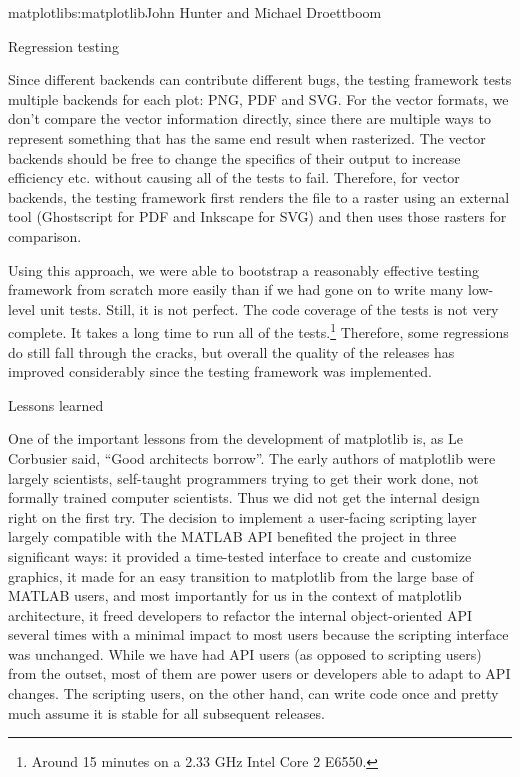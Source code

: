 \begin{aosachapter}{matplotlib}{s:matplotlib}{John Hunter and Michael Droettboom}
\begin{aosasect1}{Regression testing}

Since different backends can contribute different bugs, the testing
framework tests multiple backends for each plot: PNG, PDF and SVG.
For the vector formats, we don't compare the vector information
directly, since there are multiple ways to represent something that
has the same end result when rasterized.  The vector backends should
be free to change the specifics of their output to increase efficiency
etc. without causing all of the tests to fail.  Therefore, for vector
backends, the testing framework first renders the file to a raster
using an external tool (Ghostscript for PDF and Inkscape for SVG) and
then uses those rasters for comparison.

Using this approach, we were able to bootstrap a reasonably effective
testing framework from scratch more easily than if we had gone on to
write many low-level unit tests.  Still, it is not perfect.  The code
coverage of the tests is not very complete.  It takes a long time to
run all of the tests.\footnote{Around 15 minutes on a 2.33 GHz Intel
  Core 2 E6550.}  Therefore, some regressions do still fall through
the cracks, but overall the quality of the releases has improved
considerably since the testing framework was implemented.

\end{aosasect1}

\begin{aosasect1}{Lessons learned}

  One of the important lessons from the development of matplotlib is,
  as Le Corbusier said, ``Good architects borrow''.  The early authors
  of matplotlib were largely scientists, self-taught programmers
  trying to get their work done, not formally trained computer
  scientists.  Thus we did not get the internal design right on the
  first try.  The decision to implement a user-facing scripting layer
  largely compatible with the MATLAB API benefited the project in
  three significant ways: it provided a time-tested interface to
  create and customize graphics, it made for an easy transition to
  matplotlib from the large base of MATLAB users, and most importantly
  for us in the context of matplotlib architecture, it freed
  developers to refactor the internal object-oriented API several
  times with a minimal impact to most users because the scripting
  interface was unchanged.  While we have had API users (as opposed to
  scripting users) from the outset, most of them are power users or
  developers able to adapt to API changes.  The scripting users, on
  the other hand, can write code once and pretty much assume it is
  stable for all subsequent releases.


\end{aosasect1}
\end{aosachapter}
